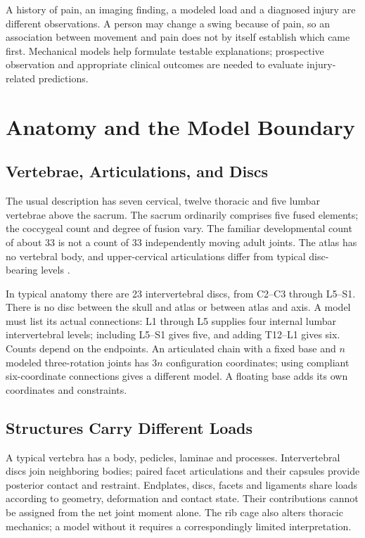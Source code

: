 A history of pain, an imaging finding, a modeled load and a diagnosed injury are different observations. A person may change a swing because of pain, so an association between movement and pain does not by itself establish which came first. Mechanical models help formulate testable explanations; prospective observation and appropriate clinical outcomes are needed to evaluate injury-related predictions.

\section{Anatomy and the Model Boundary}
\label{sec:spine_anatomy}

\subsection{Vertebrae, Articulations, and Discs}
The usual description has seven cervical, twelve thoracic and five lumbar vertebrae above the sacrum. The sacrum ordinarily comprises five fused elements; the coccygeal count and degree of fusion vary. The familiar developmental count of about 33 is not a count of 33 independently moving adult joints. The atlas has no vertebral body, and upper-cervical articulations differ from typical disc-bearing levels \citep{OpenStax2022VertebralColumn}.

In typical anatomy there are 23 intervertebral discs, from C2--C3 through L5--S1. There is no disc between the skull and atlas or between atlas and axis. A model must list its actual connections: L1 through L5 supplies four internal lumbar intervertebral levels; including L5--S1 gives five, and adding T12--L1 gives six. Counts depend on the endpoints. An articulated chain with a fixed base and $n$ modeled three-rotation joints has $3n$ configuration coordinates; using compliant six-coordinate connections gives a different model. A floating base adds its own coordinates and constraints.

\subsection{Structures Carry Different Loads}
A typical vertebra has a body, pedicles, laminae and processes. Intervertebral discs join neighboring bodies; paired facet articulations and their capsules provide posterior contact and restraint. Endplates, discs, facets and ligaments share loads according to geometry, deformation and contact state. Their contributions cannot be assigned from the net joint moment alone. The rib cage also alters thoracic mechanics; a model without it requires a correspondingly limited interpretation.

